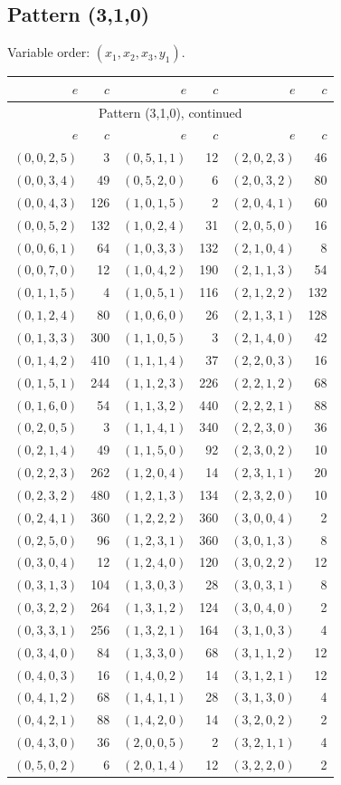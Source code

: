 \subsection{Pattern (3,1,0)}
Variable order: $(x_{1}, x_{2}, x_{3}, y_{1})$.
\begingroup\small
\setlength{\tabcolsep}{8pt}
\begin{longtable}{@{}rr@{\qquad}rr@{\qquad}rr@{}}
\toprule
$e$&$c$&$e$&$c$&$e$&$c$\\\midrule
\endfirsthead
\multicolumn{6}{c}{Pattern (3,1,0), continued}\\
\toprule
$e$&$c$&$e$&$c$&$e$&$c$\\\midrule
\endhead
$(0,0,2,5)$&3&$(0,5,1,1)$&12&$(2,0,2,3)$&46\\
$(0,0,3,4)$&49&$(0,5,2,0)$&6&$(2,0,3,2)$&80\\
$(0,0,4,3)$&126&$(1,0,1,5)$&2&$(2,0,4,1)$&60\\
$(0,0,5,2)$&132&$(1,0,2,4)$&31&$(2,0,5,0)$&16\\
$(0,0,6,1)$&64&$(1,0,3,3)$&132&$(2,1,0,4)$&8\\
$(0,0,7,0)$&12&$(1,0,4,2)$&190&$(2,1,1,3)$&54\\
$(0,1,1,5)$&4&$(1,0,5,1)$&116&$(2,1,2,2)$&132\\
$(0,1,2,4)$&80&$(1,0,6,0)$&26&$(2,1,3,1)$&128\\
$(0,1,3,3)$&300&$(1,1,0,5)$&3&$(2,1,4,0)$&42\\
$(0,1,4,2)$&410&$(1,1,1,4)$&37&$(2,2,0,3)$&16\\
$(0,1,5,1)$&244&$(1,1,2,3)$&226&$(2,2,1,2)$&68\\
$(0,1,6,0)$&54&$(1,1,3,2)$&440&$(2,2,2,1)$&88\\
$(0,2,0,5)$&3&$(1,1,4,1)$&340&$(2,2,3,0)$&36\\
$(0,2,1,4)$&49&$(1,1,5,0)$&92&$(2,3,0,2)$&10\\
$(0,2,2,3)$&262&$(1,2,0,4)$&14&$(2,3,1,1)$&20\\
$(0,2,3,2)$&480&$(1,2,1,3)$&134&$(2,3,2,0)$&10\\
$(0,2,4,1)$&360&$(1,2,2,2)$&360&$(3,0,0,4)$&2\\
$(0,2,5,0)$&96&$(1,2,3,1)$&360&$(3,0,1,3)$&8\\
$(0,3,0,4)$&12&$(1,2,4,0)$&120&$(3,0,2,2)$&12\\
$(0,3,1,3)$&104&$(1,3,0,3)$&28&$(3,0,3,1)$&8\\
$(0,3,2,2)$&264&$(1,3,1,2)$&124&$(3,0,4,0)$&2\\
$(0,3,3,1)$&256&$(1,3,2,1)$&164&$(3,1,0,3)$&4\\
$(0,3,4,0)$&84&$(1,3,3,0)$&68&$(3,1,1,2)$&12\\
$(0,4,0,3)$&16&$(1,4,0,2)$&14&$(3,1,2,1)$&12\\
$(0,4,1,2)$&68&$(1,4,1,1)$&28&$(3,1,3,0)$&4\\
$(0,4,2,1)$&88&$(1,4,2,0)$&14&$(3,2,0,2)$&2\\
$(0,4,3,0)$&36&$(2,0,0,5)$&2&$(3,2,1,1)$&4\\
$(0,5,0,2)$&6&$(2,0,1,4)$&12&$(3,2,2,0)$&2\\
\bottomrule
\end{longtable}
\endgroup
